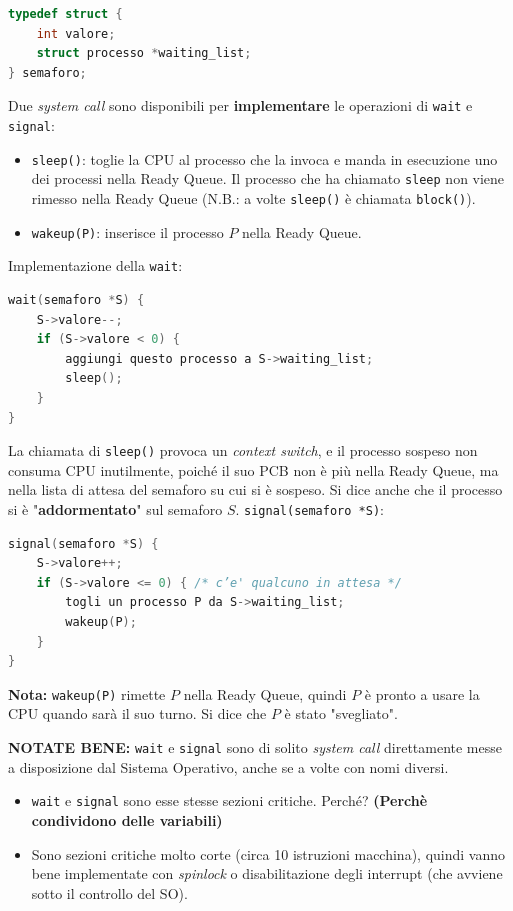 \begin{lstlisting}[language=C]
typedef struct {
    int valore;
    struct processo *waiting_list;
} semaforo;
\end{lstlisting}
Due \textit{system call} sono disponibili per \textbf{implementare} le operazioni di \texttt{wait} e \texttt{signal}:
\begin{itemize}
    \item \texttt{sleep()}: toglie la CPU al processo che la invoca e manda in esecuzione uno dei processi nella Ready Queue. Il processo che ha chiamato \texttt{sleep} non viene rimesso nella Ready Queue (N.B.: a volte \texttt{sleep()} è chiamata \texttt{block()}).
    \item \texttt{wakeup(P)}: inserisce il processo $P$ nella Ready Queue.
\end{itemize}
Implementazione della \texttt{wait}:
\begin{lstlisting}[language=C]
wait(semaforo *S) {
    S->valore--;
    if (S->valore < 0) {
        aggiungi questo processo a S->waiting_list;
        sleep();
    }
}
\end{lstlisting}
La chiamata di \texttt{sleep()} provoca un \textit{context switch}, e il processo sospeso non consuma CPU inutilmente, poiché il suo PCB non è più nella Ready Queue, ma nella lista di attesa del semaforo su cui si è sospeso.
Si dice anche che il processo si è "\textbf{addormentato}" sul semaforo $S$.
\texttt{signal(semaforo *S)}:
\begin{lstlisting}[language=C]
signal(semaforo *S) {
    S->valore++;
    if (S->valore <= 0) { /* c’e' qualcuno in attesa */
        togli un processo P da S->waiting_list;
        wakeup(P);
    }
}
\end{lstlisting}

\textbf{Nota:} \texttt{wakeup(P)} rimette $P$ nella Ready Queue, quindi $P$ è pronto a usare la CPU quando sarà il suo turno. Si dice che $P$ è stato "svegliato".

\textbf{NOTATE BENE:} \texttt{wait} e \texttt{signal} sono di solito \textit{system call} direttamente messe a disposizione dal Sistema Operativo, anche se a volte con nomi diversi.
\begin{itemize}
    \item \texttt{wait} e \texttt{signal} sono esse stesse sezioni critiche. Perché? \textbf{(Perchè condividono delle variabili)}
    \item Sono sezioni critiche molto corte (circa 10 istruzioni macchina), quindi vanno bene implementate con \textit{spinlock} o disabilitazione degli interrupt (che avviene sotto il controllo del SO).
\end{itemize}

